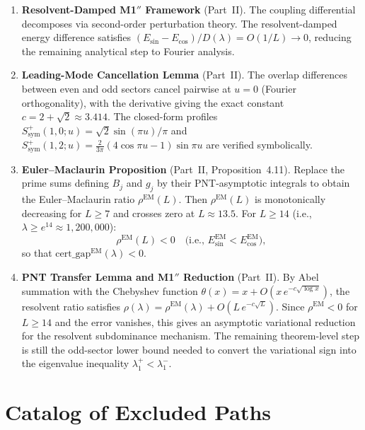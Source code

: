 \documentclass[12pt,a4paper]{article}
\theoremstyle{definition}
\theoremstyle{remark}
\begin{document}
\begin{enumerate}[label=\textbf{N\arabic*},leftmargin=3em]
  \item \textbf{Resolvent-Damped M1$''$ Framework} (Part~II). The coupling differential decomposes via second-order perturbation theory. The resolvent-damped energy difference satisfies $(E_{\sin} - E_{\cos})/D(\lambda) = O(1/L) \to 0$, reducing the remaining analytical step to Fourier analysis.

  \item \textbf{Leading-Mode Cancellation Lemma} (Part~II). The overlap differences between even and odd sectors cancel pairwise at $u = 0$ (Fourier orthogonality), with the derivative giving the exact constant $c = 2 + \sqrt{2} \approx 3.414$. The closed-form profiles $S^+_{\mathrm{sym}}(1,0;u) = \sqrt{2}\sin(\pi u)/\pi$ and $S^+_{\mathrm{sym}}(1,2;u) = \tfrac{2}{3\pi}(4\cos\pi u - 1)\sin\pi u$ are verified symbolically.

  \item \textbf{Euler--Maclaurin Proposition} (Part~II, Proposition~4.11). Replace the prime sums defining $B_j$ and $g_j$ by their PNT-asymptotic integrals to obtain the Euler--Maclaurin ratio $\rho^{\mathrm{EM}}(L)$. Then $\rho^{\mathrm{EM}}(L)$ is monotonically decreasing for $L \geq 7$ and crosses zero at $L \approx 13.5$. For $L \geq 14$ (i.e., $\lambda \geq e^{14} \approx 1{,}200{,}000$):
  \[
    \rho^{\mathrm{EM}}(L) < 0 \quad\text{(i.e., } E_{\sin}^{\mathrm{EM}} < E_{\cos}^{\mathrm{EM}}\text{)},
  \]
  so that $\mathrm{cert\_gap}^{\mathrm{EM}}(\lambda) < 0$.

  \item \textbf{PNT Transfer Lemma and M1$''$ Reduction} (Part~II). By Abel summation with the Chebyshev function $\theta(x) = x + O(x\,e^{-c\sqrt{\log x}})$, the resolvent ratio satisfies $\rho(\lambda) = \rho^{\mathrm{EM}}(\lambda) + O(L\,e^{-c\sqrt{L}})$. Since $\rho^{\mathrm{EM}} < 0$ for $L \geq 14$ and the error vanishes, this gives an asymptotic variational reduction for the resolvent subdominance mechanism. The remaining theorem-level step is still the odd-sector lower bound needed to convert the variational sign into the eigenvalue inequality $\lambda_1^+ < \lambda_1^-$.
\end{enumerate}


\section{Catalog of Excluded Paths}
\label{sec:excluded}
\end{document}
